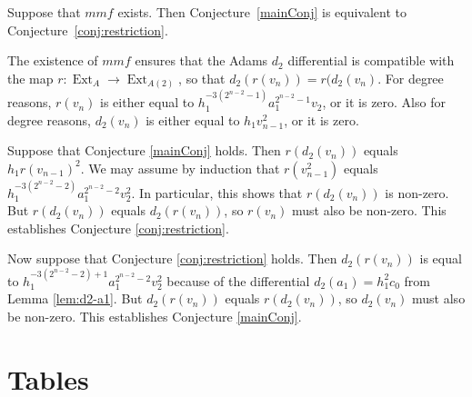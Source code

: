 \documentclass[10pt]{amsart}
\begin{document}
\begin{prop} Suppose that ${\mathit{mmf}}$ exists. Then Conjecture~\ref{mainConj}
is equivalent to Conjecture~\ref{conj:restriction}.
\end{prop}

\begin{pf}
The existence of ${\mathit{mmf}}$ ensures that
the Adams $d_2$ differential is compatible with the map
$r: \operatorname{Ext}_A {\longrightarrow} \operatorname{Ext}_{A(2)}$, so that $d_2(r(v_n)) = r(d_2(v_n)$. 
For degree reasons, $r(v_n)$ is either equal to 
$h_1^{-3(2^{n-2}-1)} a_1^{2^{n-2}-1} v_2$, or it is zero. 
Also for degree reasons, $d_2(v_n)$ is either equal to
$h_1 v_{n-1}^2$, or it is zero.

Suppose that Conjecture \ref{mainConj} holds.
Then $r(d_2(v_n))$ equals $h_1 r(v_{n-1})^2$.  We may assume by
induction that $r(v_{n-1}^2)$ equals $h_1^{-3(2^{n-2}-2)} a_1^{2^{n-2} -2} v_2^2$.
In particular, this shows that 
$r(d_2(v_n))$ is non-zero.
But $r(d_2(v_n))$ equals $d_2 (r(v_n))$, so $r(v_n)$ must also be non-zero.
This establishes Conjecture \ref{conj:restriction}.

Now suppose that Conjecture \ref{conj:restriction} holds.
Then $d_2(r(v_n))$ is equal to $h_1^{-3(2^{n-2}-2)+1} a_1^{2^{n-2}-2} v_2^2$
because of the differential $d_2(a_1) = h_1^2 c_0$ from Lemma \ref{lem:d2-a1}.
But $d_2(r(v_n))$ equals $r(d_2(v_n))$,
so $d_2(v_n)$ must also be non-zero.
This establishes Conjecture \ref{mainConj}.
\end{pf}

\clearpage
\section{Tables}\label{sec:Tables}
\end{document}

